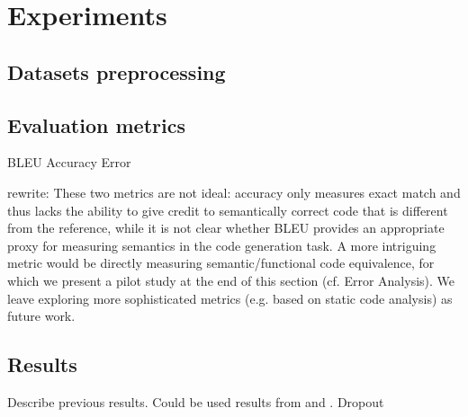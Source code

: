 \chapter{Experiments} \label{Chapter5} 


\section{Datasets preprocessing} \label{preprocessing}

\section{Evaluation metrics}
BLEU
Accuracy
Error

rewrite: These two metrics are not ideal: accuracy only measures exact match and thus lacks the ability to give credit to semantically correct code that is different from the reference, while it is not clear whether BLEU provides an appropriate proxy for measuring semantics in the code generation task. A more
intriguing metric would be directly measuring semantic/functional code equivalence, for which we present a pilot study
at the end of this section (cf. Error Analysis). We leave exploring more sophisticated metrics (e.g. based on static code
analysis) as future work.

\section{Results}

Describe previous results. Could be used results from \cite{Yin2017} and \cite{Barone2017}.
Dropout


